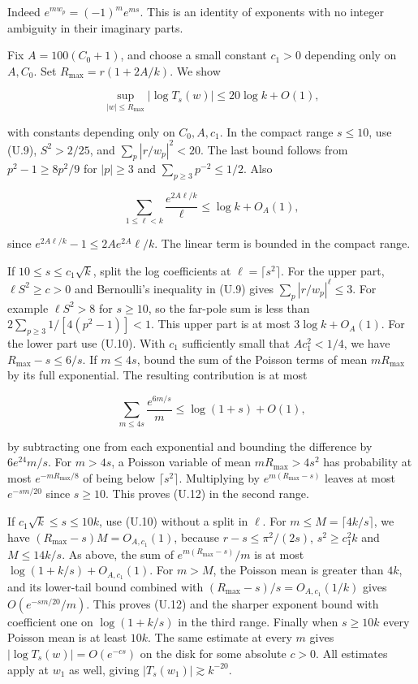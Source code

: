 \documentclass[11pt]{article}
\begin{document}
Indeed $e^{mw_p}=(-1)^m e^{ms}$. This is an identity of exponents with no integer ambiguity in their imaginary parts.

Fix $A=100(C_0+1)$, and choose a small constant $c_1>0$ depending only on $A,C_0$. Set $R_{\max}=r(1+2A/k)$. We show

\[
\sup_{|w|\le R_{\max}}|\log T_s(w)|\le20\log k+O(1),
\tag{U.12}
\]

with constants depending only on $C_0,A,c_1$. In the compact range $s\le10$, use (U.9), $S^2>2/25$, and $\sum_p|r/w_p|^2<20$. The last bound follows from $p^2-1\ge8p^2/9$ for $|p|\ge3$ and $\sum_{p\ge3}p^{-2}\le1/2$. Also

\[
\sum_{1\le \ell<k}\frac{e^{2A\ell/k}}{\ell}
\le \log k+O_A(1),
\]

since $e^{2A\ell/k}-1\le 2Ae^{2A}\ell/k$. The linear term is bounded in the compact range.

If $10\le s\le c_1\sqrt k$, split the log coefficients at $\ell=\lceil s^2\rceil$. For the upper part, $\ell S^2\ge c>0$ and Bernoulli's inequality in (U.9) gives $\sum_p |r/w_p|^\ell\le3$. For example $\ell S^2>8$ for $s\ge10$, so the far-pole sum is less than $2\sum_{p\ge3}1/[4(p^2-1)]<1$. This upper part is at most $3\log k+O_A(1)$. For the lower part use (U.10). With $c_1$ sufficiently small that $A c_1^2<1/4$, we have $R_{\max}-s\le6/s$. If $m\le4s$, bound the sum of the Poisson terms of mean $mR_{\max}$ by its full exponential. The resulting contribution is at most

\[
\sum_{m\le4s}\frac{e^{6m/s}}m \le \log(1+s)+O(1),
\]

by subtracting one from each exponential and bounding the difference by $6e^{24}m/s$. For $m>4s$, a Poisson variable of mean $mR_{\max}>4s^2$ has probability at most $e^{-mR_{\max}/8}$ of being below $\lceil s^2\rceil$. Multiplying by $e^{m(R_{\max}-s)}$ leaves at most $e^{-sm/20}$ since $s\ge10$. This proves (U.12) in the second range.

If $c_1\sqrt k\le s\le10k$, use (U.10) without a split in $\ell$. For $m\le M=\lceil4k/s\rceil$, we have $(R_{\max}-s)M=O_{A,c_1}(1)$, because $r-s\le\pi^2/(2s)$, $s^2\ge c_1^2 k$ and $M\le14k/s$. As above, the sum of $e^{m(R_{\max}-s)}/m$ is at most $\log(1+k/s)+O_{A,c_1}(1)$. For $m>M$, the Poisson mean is greater than $4k$, and its lower-tail bound combined with $(R_{\max}-s)/s=O_{A,c_1}(1/k)$ gives $O(e^{-sm/20}/m)$. This proves (U.12) and the sharper exponent bound with coefficient one on $\log(1+k/s)$ in the third range. Finally when $s\ge10k$ every Poisson mean is at least $10k$. The same estimate at every $m$ gives $|\log T_s(w)|=O(e^{-cs})$ on the disk for some absolute $c>0$. All estimates apply at $w_1$ as well, giving $|T_s(w_1)|\gtrsim k^{-20}$.
\end{document}
